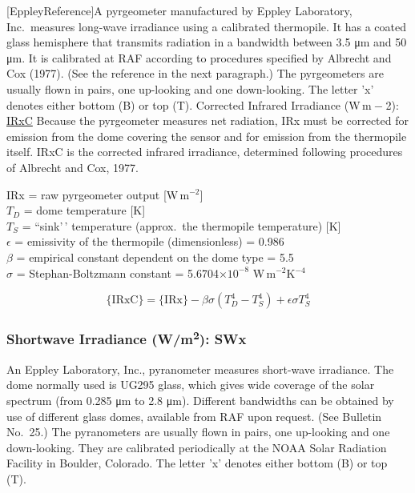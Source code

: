 \documentclass[
  english,
]{book}
\begin{document}
\protect\hypertarget{EppleyReference}{}{{[}EppleyReference{]}}A pyrgeometer manufactured by Eppley Laboratory, Inc.~measures long-wave irradiance using a calibrated thermopile. It has a coated glass hemisphere that transmits radiation in a bandwidth between 3.5 {μm} and 50 {μm}. It is calibrated at RAF according to procedures specified by Albrecht and Cox (1977). (See the reference in the next paragraph.) The pyrgeometers are usually flown in pairs, one up-looking and one down-looking. The letter 'x' denotes either bottom (B) or top (T).
Corrected Infrared Irradiance (W m{ − 2}): \underline{IRxC}
Because the pyrgeometer measures net radiation, IRx must be corrected for emission from the dome covering the sensor and for emission from the thermopile itself. IRxC is the corrected infrared irradiance, determined following procedures of Albrecht and Cox, 1977.

IRx = raw pyrgeometer output {[}W\(\,\)m\(^{-2}\){]}\\
\(T_{D}\) = dome temperature {[}K{]}\\
\(T_{S}\) = ``sink'\,' temperature (approx.~the thermopile temperature)
{[}K{]}\\
\(\epsilon\) = emissivity of the thermopile (dimensionless) = 0.986\\
\(\beta\) = empirical constant dependent on the dome type = 5.5\\
\(\sigma\) = Stephan-Boltzmann constant = 5.6704\(\times10^{-8}\) W\(\,\)m\(^{-2}\)K\(^{-4}\)

\begin{equation}
\mathrm{\{IRxC\}}=\mathrm{\{IRx\}}-\beta\sigma(T_{D}^{4}-T_{S}^{4})+\epsilon\sigma T_{S}^{4}
\label{eq:IRxTbox}
\end{equation}

\hypertarget{swx}{%
\subsubsection*{\texorpdfstring{Shortwave Irradiance (W/m\textsuperscript{2}): SWx}{Shortwave Irradiance (W/m2): SWx}}\label{swx}}

An Eppley Laboratory, Inc., pyranometer measures short-wave irradiance. The dome normally used is UG295 glass, which gives wide coverage of the solar spectrum (from 0.285 {μm} to 2.8 {μm}). Different bandwidths can be obtained by use of different glass domes, available from RAF upon request. (See Bulletin No.~25.) The pyranometers are usually flown in pairs, one up-looking and one down-looking. They are calibrated periodically at the NOAA Solar Radiation Facility in Boulder, Colorado. The letter 'x' denotes either bottom (B) or top (T).
\end{document}
